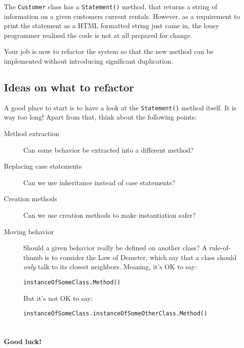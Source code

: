 \documentclass{article}
\begin{document}
  The \texttt{Customer} class has a \texttt{Statement()} method, that returns a string of information on a given customers current rentals. However, as a requirement to print the statement as a HTML formatted string just came in, the lousy programmer realized the code is not at all prepared for change.
  
  Your job is now to refactor the system so that the new method can be implemented without introducing significant duplication.

  \subsection*{Ideas on what to refactor}
  A good place to start is to have a look at the \texttt{Statement()} method itself. It is way too long! Apart from that, think about the following points:

  \begin{description}
    \item[Method extraction] Can some behavior be extracted into a different method?
    \item[Replacing case statements] Can we use inheritance instead of case statements?
    \item[Creation methods] Can we use creation methods to make instantiation safer?
    \item[Moving behavior] Should a given behavior really be defined on another class? A rule-of-thumb is to consider the Law of Demeter, which say that a class should \emph{only} talk to its closest neighbors. Meaning, it's OK to say:

    \texttt{instanceOfSomeClass.Method()}

    But it's not OK to say:
    
    \texttt{instanceOfSomeClass.instanceOfSomeOtherClass.Method()}
  \end{description}


\section*{}
  \paragraph{ Good luck! }
\end{document}

